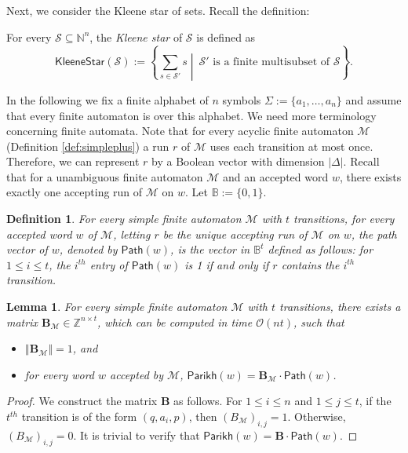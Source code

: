 \documentclass[10pt,a4paper]{article}
\newtheorem{lemma}[theorem]{Lemma}
\newtheorem{definition}[theorem]{Definition}
\theoremstyle{definition}
\theoremstyle{remark}
\newcommand{\cM}{\mathcal{M}}
\newcommand{\cO}{\mathcal{O}}
\newcommand{\cS}{\mathcal{S}}
\newcommand{\bbN}{\mathbb{N}}
\newcommand{\bbB}{\mathbb{B}}
\newcommand{\bbZ}{\mathbb{Z}}
\newcommand{\bfB}{\mathbf{B}}
\newcommand{\setc}[2]        {\left\{ #1 \middle|\  #2 \right\}}
\newcommand{\abs}[1]         {{\left| #1 \right|}}
\newcommand{\norm}[1]        {\left\Vert #1 \right\Vert}
\newcommand{\kstar}[1] {\mathsf{KleeneStar}\left( #1 \right)}
\newcommand{\parikh}[1] {\mathsf{Parikh}\left( #1 \right)}
\newcommand{\mpath}[1] {\mathsf{Path}\left( #1 \right)}
\newcommand{\bigO}[1] {{\cO\left( #1 \right)}}
\begin{document}
Next, we consider the Kleene star of sets.
Recall the definition:

\medskip

For every $\cS \subseteq \bbN^n$,
the \emph{Kleene star} of $\cS$ is defined as
\begin{equation*}
    \kstar{\cS} := \setc{\sum_{s \in \cS'} s}{\text{$\cS'$ is a finite multisubset of $\cS$}}.
\end{equation*}

\medskip

In the following we fix a finite alphabet of $n$ symbols $\Sigma:=\{a_1,\ldots,a_n\}$
and assume that every finite automaton is over this alphabet.
We need more terminology concerning finite automata.
Note that for every acyclic finite automaton $\cM$ (Definition \ref{def:simpleplus})
a run $r$ of $\cM$ uses each transition at most once.
Therefore, we can represent $r$ by a Boolean vector with dimension $\abs{\Delta}$.
Recall that for a unambiguous finite automaton $\cM$ and an accepted word $w$, there exists exactly one accepting run of $\cM$ on $w$.
Let $\bbB:=\{0,1\}$.

\begin{definition}
    For every simple finite automaton $\cM$ with $t$ transitions,
    for every accepted word $w$ of $\cM$,
    letting $r$ be the unique accepting run of $\cM$ on $w$,
    the \emph{path vector} of $w$, denoted by $\mpath{w}$,
    is the vector in $\bbB^t$ defined as follows:
    for $1 \le i \le t$, the $i^{th}$ entry of $\mpath{w}$ is 1
    if and only if $r$ contains the $i^{th}$ transition.
\end{definition}

\begin{lemma}\label{lem:path}
For every simple finite automaton $\cM$ with $t$ transitions,
there exists a matrix $\bfB_\cM \in \bbZ^{n \times t}$,
which can be computed in time $\bigO{nt}$,
such that
\begin{itemize}
\item $\norm{\bfB_\cM} = 1$, and
\item for every word $w$ accepted by $\cM$, $\parikh{w} = \bfB_\cM\cdot\mpath{w}$.
\end{itemize}
\end{lemma}

\begin{proof}
    We construct the matrix $\bfB$ as follows.
    For $1 \le i \le n$ and $1 \le j \le t$,
    if the $t^{th}$ transition is of the form $(q, a_i, p)$,
    then $(B_\cM)_{i, j} = 1$.
    Otherwise, $(B_\cM)_{i, j} = 0$.
    It is trivial to verify that
    $\parikh{w} = \bfB\cdot\mpath{w}$.
\end{proof}
\end{document}
